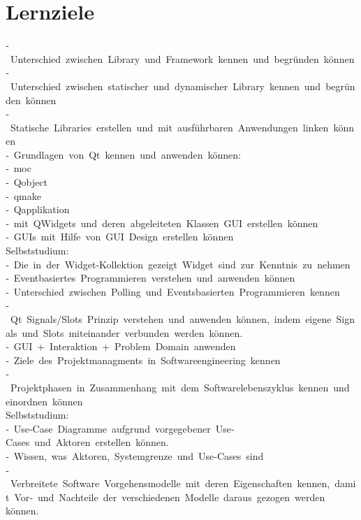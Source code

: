\chapter{Lernziele}

‐ Unterschied zwischen Library und Framework kennen und begründen können \\
‐ Unterschied zwischen statischer und dynamischer Library kennen und begründen können \\
‐ Statische Libraries erstellen und mit ausführbaren Anwendungen linken können \\

‐ Grundlagen von Qt kennen und anwenden können: \\
‐ moc \\
‐ Qobject \\
‐ qmake \\
‐ Qapplikation \\

‐ mit QWidgets und deren abgeleiteten Klassen GUI erstellen können\\
‐ GUIs mit Hilfe von GUI Design erstellen können \\
Selbststudium: \\
‐ Die in der Widget‐Kollektion gezeigt Widget sind zur Kenntnis zu nehmen \\

‐ Eventbasiertes Programmieren verstehen und anwenden können \\
‐ Unterschied zwischen Polling und Eventsbasierten Programmieren kennen \\
‐ Qt Signals/Slots Prinzip verstehen und anwenden können, indem eigene Signals und Slots miteinander verbunden werden können. \\

‐ GUI + Interaktion + Problem Domain anwenden \\
‐ Ziele des Projektmanagments in Softwareengineering kennen \\
‐ Projektphasen in Zusammenhang mit dem Softwarelebenszyklus kennen und einordnen können \\
Selbststudium: \\
‐ Use‐Case Diagramme aufgrund vorgegebener Use‐Cases und Aktoren erstellen können. \\
‐ Wissen, was Aktoren, Systemgrenze und Use‐Cases sind \\

‐ Verbreitete Software Vorgehensmodelle mit deren Eigenschaften kennen, damit Vor‐ und Nachteile der verschiedenen Modelle daraus gezogen werden 
können. 

